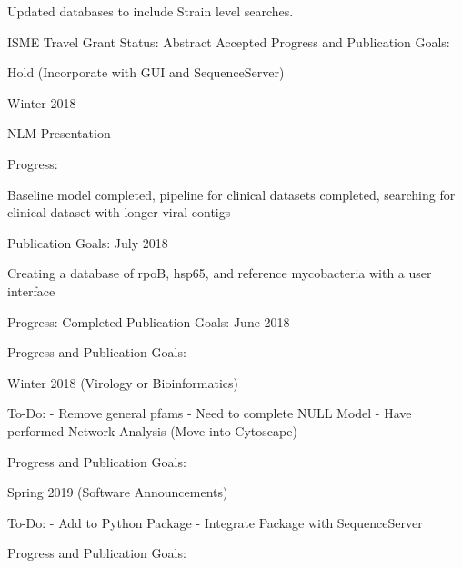 \documentclass[idxtotoc,hyperref,openany]{labbook} %
\begin{document}


Updated databases to include Strain level searches. 

ISME Travel Grant Status: Abstract Accepted
\vspace{0.2cm}
Progress and Publication Goals: 

Hold (Incorporate with GUI and SequenceServer) 

Winter 2018



NLM Presentation
\vspace{0.2cm}

Progress:

Baseline model completed, pipeline for clinical datasets completed, searching for clinical dataset with longer viral contigs 

\vspace{0.2cm}
Publication Goals: July 2018 



Creating a database of rpoB, hsp65, and reference mycobacteria with a user interface

Progress: Completed
\vspace{0.2cm}
Publication Goals: June 2018






\vspace{0.2cm}
Progress and Publication Goals: 

Winter 2018   (Virology or Bioinformatics)

To-Do:
- Remove general pfams
- Need to complete NULL Model 
- Have performed Network Analysis (Move into Cytoscape)



\vspace{0.2cm}
Progress and Publication Goals: 

Spring 2019 (Software Announcements)

To-Do:
- Add to Python Package
- Integrate Package with SequenceServer




\vspace{0.2cm}
Progress and Publication Goals: 
\end{document}
